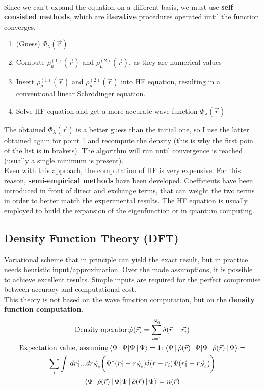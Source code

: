\\
Since we can't expand the equation on a different basis, we must use \textbf{self consisted methods}, which are \textbf{iterative} procedures operated until the function converges.
\begin{enumerate}
	\item (Guess) $\Phi_\lambda (\vec{r})$
	\item Compute $\rho_\mu^{(1)}(\vec{r})$ and $\rho_\mu^{(2)}(\vec{r})$, as they are numerical values
	\item Insert $\rho_\mu^{(1)}(\vec{r})$ and $\rho_\mu^{(2)}(\vec{r})$ into HF equation, resulting in a conventional linear Schr\"odinger equation.
	\item Solve HF equation and get a more accurate wave function $\Phi_\lambda (\vec{r})$
	\end{enumerate}
The obtained $\Phi_\lambda (\vec{r})$ is a better guess than the initial one, so I use the latter obtained again for point 1 and recompute the density (this is why the first poin of the list is in brakets). 
The algorithm will run until convergence is reached (usually a single minimum is present). \\
Even with this approach, the computation of HF is very expensive. For this reason, \textbf{semi-empirical methods} have been developed. Coefficients have been introduced in front of direct and exchange terms, that can weight the two terms in order to better match the experimental results. The HF equation is usually employed to build the expansion of the eigenfunction or in quantum computing.\\

\subsection{Density Function Theory (DFT)}
Variational scheme that in principle can yield the exact result,  but in practice needs heuristic input/approximation. 
Over the made assumptions, it is possible to achieve excellent results. 
Simple inputs are required for the perfect compromise between accuracy and computational cost.\\
This theory is not based on the wave function computation, but on the \textbf{density function computation}.\\


\begin{multline}
 \text{Density operator:}\hat{\rho}(\vec{r})=\sum_{i=1}^{N_0}\delta(\vec{r}-\vec{r_i})\\
\text{Expectation value, assuming} \braket{\Psi\,|\,\Psi}=1 \text{:}\, \braket{\Psi\,|\,\hat{\rho}(\vec{r})\,|\,\Psi}=\\
\sum_i \int\,d\vec{r_1}...d\vec{r_{N_e}}\bigg(\Psi^*(\vec{r_1}-\vec{r_{N_e}})\delta(\vec{r}-\vec{r_i})\Psi(\vec{r_1}-\vec{r_{N_e}})\bigg)\\
\braket{\Psi\,|\,\hat{\rho}(\vec{r})\,|\,\Psi}=n(\vec{r})
\end{multline}


